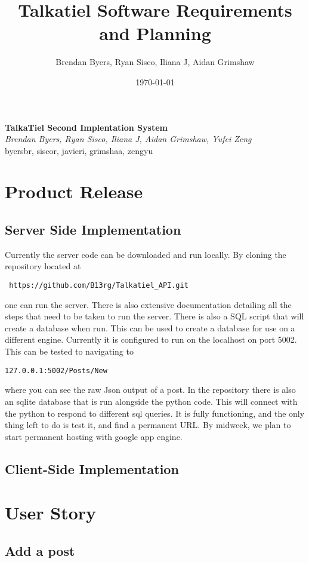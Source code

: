 \documentclass[12pt]{article}
\title{Talkatiel Software Requirements and Planning}
\author{Brendan Byers, Ryan Sisco, Iliana J, Aidan Grimshaw}
\date{\today}
\begin{document}
\begin{center}
      \Large\textbf{TalkaTiel Second Implentation System}\\
      \large\textit{Brendan Byers, Ryan Sisco, Iliana J, Aidan Grimshaw, Yufei Zeng}\\
      \large{byersbr, siscor, javieri, grimshaa, zengyu}\\
   \end{center}

\tableofcontents
\section{Product Release} \subsection{Server Side Implementation} Currently the
server code can be downloaded and run locally.  By cloning the repository
located at\begin{verbatim} https://github.com/B13rg/Talkatiel_API.git
\end{verbatim}one can run the server.  There is also extensive documentation
detailing all the steps that need to be taken to run the server.  There is also
a SQL script that will create a database when run.  This can be used to create a
database for use on a different engine.  Currently it is configured to run on
the localhost on port 5002.  This can be tested to navigating to
\begin{verbatim}127.0.0.1:5002/Posts/New \end{verbatim}where you can see the raw
Json output of a post.  In the repository there is also an sqlite database that
is run alongside the python code.  This will connect with the python to respond
to different sql queries.  It is fully functioning, and the only thing left to
do is test it, and find a permanent URL. By midweek, we plan to start permanent
hosting with google app engine.

   \subsection{Client-Side Implementation}
\section{User Story}
      \subsection{Add a post}
\end{document}

